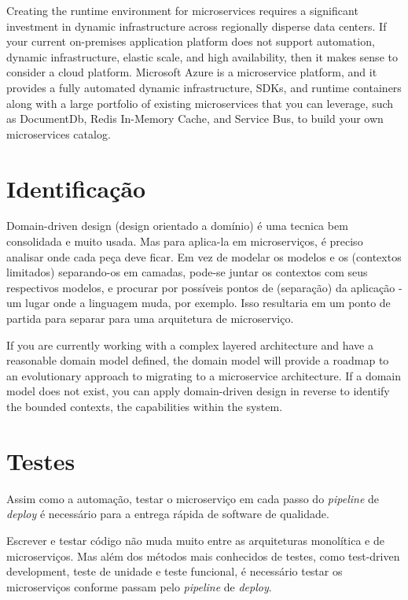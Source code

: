 Creating the runtime environment for microservices requires a significant investment in dynamic infrastructure across regionally disperse data centers. If your current on-premises application platform does not support automation, dynamic infrastructure, elastic scale, and high availability, then it makes sense to consider a cloud platform. Microsoft Azure is a microservice platform, and it provides a fully automated dynamic infrastructure, SDKs, and runtime containers along with a large portfolio of existing microservices that you can leverage, such as DocumentDb, Redis In-Memory Cache, and Service Bus, to build your own microservices catalog.

\section{Identificação}

Domain-driven design (design orientado a domínio) é uma tecnica bem consolidada e muito usada. Mas para aplica-la em microserviços, é preciso analisar onde cada peça deve ficar. Em vez de modelar os modelos e os (contextos limitados) separando-os em camadas, pode-se juntar os contextos com seus respectivos modelos, e procurar por possíveis pontos de (separação) da aplicação - um lugar onde a linguagem muda, por exemplo. Isso resultaria em um ponto de partida para separar para uma arquitetura de microserviço.

If you are currently working with a complex layered architecture and have a reasonable domain model defined, the domain model will provide a roadmap to an evolutionary approach to migrating to a microservice architecture. If a domain model does not exist, you can apply domain-driven design in reverse to identify the bounded contexts, the capabilities within the system.

\section{Testes}

Assim como a automação, testar o microserviço em cada passo do \emph{pipeline} de \emph{deploy} é necessário para a entrega rápida de software de qualidade.

Escrever e testar código não muda muito entre as arquiteturas monolítica e de microserviços. Mas além dos métodos mais conhecidos de testes, como test-driven development, teste de unidade e teste funcional, é necessário testar os microserviços conforme passam pelo \emph{pipeline} de \emph{deploy}.

